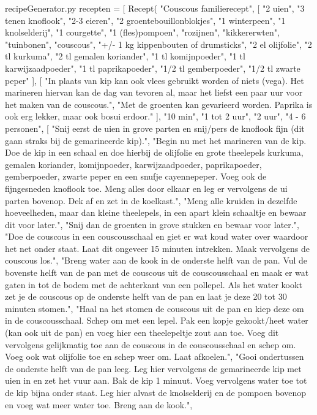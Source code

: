 \begin{filecontents*}{recipeGenerator.py}
recepten = [
    Recept(
	"Couscous familierecept",
	[
		"2 uien",
		"3 tenen knoflook",
		"2-3 eieren",
		"2 groentebouillonblokjes",
		"1 winterpeen",
		"1 knolselderij",
		"1 courgette",
		"1 (fles)pompoen",
		"rozijnen",
		"kikkererwten",
		"tuinbonen",
		"couscous",
		"+/- 1 kg kippenbouten of drumsticks",
		"2 el olijfolie",
		"2 tl kurkuma",
		"2 tl gemalen koriander",
		"1 tl komijnpoeder",
		"1 tl karwijzaadpoeder",
		"1 tl paprikapoeder",
		"1/2 tl gemberpoeder",
		"1/2 tl zwarte peper"
	],
	[
		"In plaats van kip kan ook vlees gebruikt worden of niets (vega). Het marineren hiervan kan de dag van tevoren al, maar het liefst een paar uur voor het maken van de couscous.",
		"Met de groenten kan gevarieerd worden. Paprika is ook erg lekker, maar ook bosui erdoor."
	],
	"10 min",
	"1 tot 2 uur",
	"2 uur",
	"4 - 6 personen",
	[
		"Snij eerst de uien in grove parten en snij/pers de knoflook fijn (dit gaan straks bij de gemarineerde kip).",
		"Begin nu met het marineren van de kip. Doe de kip in een schaal en doe hierbij de olijfolie en grote theelepels kurkuma, gemalen koriander, komijnpoeder, karwijzaadpoeder, paprikapoeder, gemberpoeder, zwarte peper en een snufje cayennepeper. Voeg ook de fijngesneden knoflook toe. Meng alles door elkaar en leg er vervolgens de ui parten bovenop. Dek af en zet in de koelkast.",
		"Meng alle kruiden in dezelfde hoeveelheden, maar dan kleine theelepels, in een apart klein schaaltje en bewaar dit voor later.",
		"Snij dan de groenten in grove stukken en bewaar voor later.",
		"Doe de couscous in een couscousschaal en giet er wat koud water over waardoor het net onder staat. Laat dit ongeveer 15 minuten intrekken. Maak vervolgens de couscous los.",
		"Breng water aan de kook in de onderste helft van de pan. Vul de bovenste helft van de pan met de couscous uit de couscousschaal en maak er wat gaten in tot de bodem met de achterkant van een pollepel. Als het water kookt zet je de couscous op de onderste helft van de pan en laat je deze 20 tot 30 minuten stomen.",
		"Haal na het stomen de couscous uit de pan en kiep deze om in de couscousschaal. Schep om met een lepel. Pak een kopje gekookt/heet water (kan ook uit de pan) en voeg hier een theelepeltje zout aan toe. Voeg dit vervolgens gelijkmatig toe aan de couscous in de couscousschaal en schep om. Voeg ook wat olijfolie toe en schep weer om. Laat afkoelen.",
		"Gooi ondertussen de onderste helft van de pan leeg. Leg hier vervolgens de gemarineerde kip met uien in en zet het vuur aan. Bak de kip 1 minuut. Voeg vervolgens water toe tot de kip bijna onder staat. Leg hier alvast de knolselderij en de pompoen bovenop en voeg wat meer water toe. Breng aan de kook.",

\end{filecontents*}
